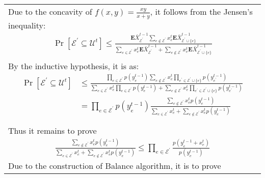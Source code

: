 \documentclass{article}
\begin{document}
\begin{tabular}{l}
Due to the concavity of $f(x, y)=\frac{x y}{x+y}$, it follows from the Jensen's inequality:
\begin{equation*}
\begin{aligned}
\operatorname{Pr}\left[\mathcal{E}^{\prime} \subseteq \mathcal{U}^{t}\right] 
\leq
 \frac{\mathbf{E} \bar{X}_{\mathcal{E}^{\prime}}^{t-1} \sum_{e \notin \mathcal{E}^{\prime}}  x_{e}^{t} \mathbf{E} \bar{X}_{\mathcal{E}^{\prime} \cup\{e\}}^{t-1}}{\sum_{e \in \mathcal{E}^{\prime}} x_{e}^{t} \mathbf{E} \bar{X}_{\mathcal{E}^{\prime}}^{t-1}+\sum_{e \notin \mathcal{E}^{\prime}}  x_{e}^{t} \mathbf{E} \bar{X}_{\mathcal{E}^{\prime} \cup\{e\}}^{t-1}}
\end{aligned}
\end{equation*}
\\
By the inductive hypothesis, it is as:
\begin{equation*}
\begin{aligned}
\operatorname{Pr}\left[\mathcal{E}^{\prime} \subseteq \mathcal{U}^{t}\right] & \leq \frac{\prod_{e \in \mathcal{E}^{\prime}} p\left(y_{e}^{t-1}\right) \sum_{e \notin \mathcal{E}^{\prime}}  x_{e}^{t} \prod_{e^{\prime} \in \mathcal{E}^{\prime} \cup\{e\}} p\left(y_{e^{\prime}}^{t-1}\right)}{\sum_{e \in \mathcal{E}^{\prime}}  x_{e}^{t} \prod_{e \in \mathcal{E}^{\prime}} p\left(y_{e}^{t-1}\right)+\sum_{e \notin \mathcal{E}^{\prime}}  x_{e}^{t} \prod_{e^{\prime} \in \mathcal{E}^{\prime} \cup\{e\}} p\left(y_{e^{\prime}}^{t-1}\right)} 
\\
&=\prod_{e \in \mathcal{E}^{\prime}} p\left(y_{e}^{t-1}\right) \frac{\sum_{e \notin \mathcal{E}^{\prime}}  x_{e}^{t} p\left(y_{e}^{t-1}\right)}{\sum_{e \in \mathcal{E}^{\prime}}  x_{e}^{t}+\sum_{e \notin \mathcal{E}^{\prime}}  x_{e}^{t} p\left(y_{e}^{t-1}\right)} 
\\
\end{aligned}
\end{equation*}
\\
Thus it remains to prove 
\begin{equation*}
\begin{aligned}
\frac{ \sum_{e \notin \mathcal{E}^{\prime}} x_{e}^{t} p(y_e^{t-1})}{\sum_{e \in \mathcal{E}^{\prime}}  x_{e}^{t} +\sum_{e \notin \mathcal{E}^{\prime}} x_{e}^{t} p(y_e^{t-1})} 
\leq
\prod_{ e \in \mathcal{E}^{\prime}} \frac{p(y_e^{t-1} + x_e^t)}{p(y_e^{t-1})}
\end{aligned}
\end{equation*}
Due to the construction of Balance algorithm, it is to prove 
\begin{equation*}

\end{equation*}
\end{tabular}
\end{document}
